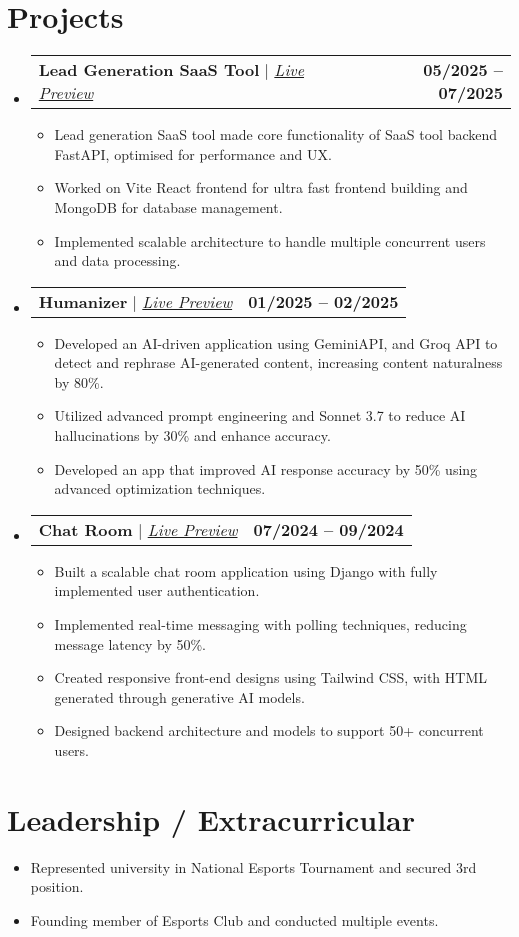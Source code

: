 \documentclass[letterpaper,11pt]{article}
\makeatletter
\newcommand{\resumeItem}[1]{%
  \item\small{
    {#1 \vspace{-2pt}}
  }
}
\newcommand{\resumeProjectHeading}[2]{
    \item
    \begin{tabular*}{1.001\textwidth}{l@{\extracolsep{\fill}}r}
      \small#1 & \textbf{\small #2}\\
    \end{tabular*}\vspace{-7pt}
}
\newcommand{\resumeSubHeadingListStart}{\begin{itemize}[leftmargin=0.0in, label={}]}
\newcommand{\resumeSubHeadingListEnd}{\end{itemize}}
\newcommand{\resumeItemListStart}{\begin{itemize}}
\newcommand{\resumeItemListEnd}{\end{itemize}\vspace{-5pt}}
\makeatother
\begin{document}
\section{Projects}
\vspace{-5pt}
\resumeSubHeadingListStart
  \resumeProjectHeading
      {\textbf{Lead Generation SaaS Tool} $|$ \emph{\href{https://leads.easemyexpo.in/}{Live Preview}}}{05/2025 -- 07/2025 }
      \resumeItemListStart
        \resumeItem{Lead generation SaaS tool made core functionality of SaaS tool backend FastAPI, optimised for performance and UX.}
        \resumeItem{Worked on Vite React frontend for ultra fast frontend building and MongoDB for database management.}
        \resumeItem{Implemented scalable architecture to handle multiple concurrent users and data processing.}
      \resumeItemListEnd
      \vspace{-13pt}
  \resumeProjectHeading
      {\textbf{Humanizer} $|$ \emph{\href{https://humanizer-olive.vercel.app/}{Live Preview}}}{01/2025 -- 02/2025}
      \resumeItemListStart
        \resumeItem{Developed an AI-driven application using GeminiAPI, and Groq API to detect and rephrase AI-generated content, increasing content naturalness by 80\%.}
        \resumeItem{Utilized advanced prompt engineering and Sonnet 3.7 to reduce AI hallucinations by 30\% and enhance accuracy.}
        \resumeItem{Developed an app that improved AI response accuracy by 50\% using advanced optimization techniques.}
      \resumeItemListEnd
      \vspace{-13pt}
  \resumeProjectHeading
      {\textbf{Chat Room} $|$ \emph{\href{https://chatroom-os4ddry5.b4a.run/}{Live Preview}} }{07/2024 -- 09/2024}
      \resumeItemListStart
        \resumeItem{Built a scalable chat room application using Django with fully implemented user authentication.}
        \resumeItem{Implemented real-time messaging with polling techniques, reducing message latency by 50\%.}
        \resumeItem{Created responsive front-end designs using Tailwind CSS, with HTML generated through generative AI models.}
        \resumeItem{Designed backend architecture and models to support 50+ concurrent users.}
      \resumeItemListEnd 
\resumeSubHeadingListEnd
\vspace{-15pt}

\section{Leadership / Extracurricular}
\resumeSubHeadingListStart
  \resumeItemListStart
    \resumeItem{Represented university in National Esports Tournament and secured 3rd position.}
    \resumeItem{Founding member of Esports Club and conducted multiple events.}
  \resumeItemListEnd
\resumeSubHeadingListEnd
\end{document}
